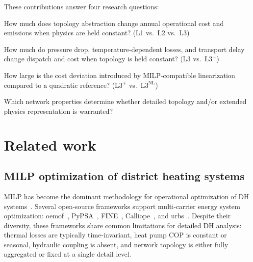 \documentclass[review,3p]{elsarticle}
\newcommand{\Lplus}{\mathrm{L3}^{+}}
\newcommand{\Lnl}{\mathrm{L3}^{\mathrm{NL}}}
\begin{document}
These contributions answer four research questions:
%
\begin{description}[style=nextline, nosep, leftmargin=1.5em]
  \item[RQ1 --- Topology effect:]
    How much does topology abstraction change annual operational cost
    and  emissions when physics are held constant?
    (L1 vs.\ L2 vs.\ L3)

  \item[RQ2 --- Physics fidelity effect:]
    How much do pressure drop, temperature-dependent losses, and
    transport delay change dispatch and cost when topology is held
    constant? (L3 vs.\ $\Lplus$)

  \item[RQ3 --- Linearization error:]
    How large is the cost deviation introduced by MILP-compatible
    linearization compared to a quadratic reference?
    ($\Lplus$ vs.\ $\Lnl$)

  \item[RQ4 --- Generalizability:]
    Which network properties determine whether detailed topology
    and/or extended physics representation is warranted?
\end{description}

\section{Related work}
\label{sec:related_work}

\subsection{MILP optimization of district heating systems}
\label{sec:rw_milp}

MILP has become the dominant methodology for operational optimization
of DH systems~\cite{Fang2016,Guelpa2019review}. Several open-source
frameworks support multi-carrier energy system optimization:
oemof~\cite{Hilpert2018_oemof}, PyPSA~\cite{Brown2018_pypsa},
FINE~\cite{Welder2018_FINE}, Calliope~\cite{Pfenninger2018_calliope},
and urbs~\cite{Dorfner2016_urbs}. Despite their diversity, these
frameworks share common limitations for detailed DH analysis: thermal
losses are typically time-invariant, heat pump COP is constant or
seasonal, hydraulic coupling is absent, and network topology is either
fully aggregated or fixed at a single detail level.
\end{document}
